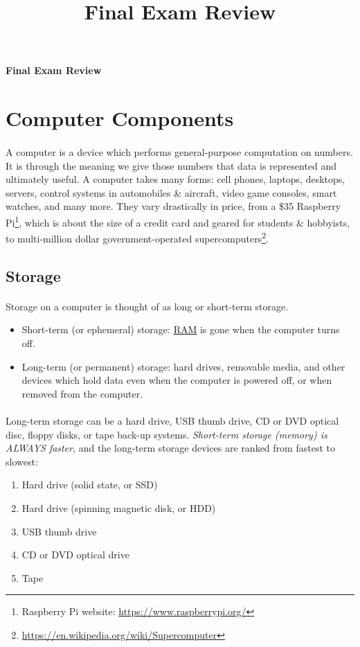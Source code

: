 \documentclass[letter,11pt]{article}
\title{Final Exam Review}
\begin{document}
\huge
\textbf{Final Exam Review}
\normalsize

\tableofcontents

\section{Computer Components}
\paragraph{}A computer is a device which performs general-purpose computation on numbers. It is through the meaning we give those numbers that data is represented and ultimately useful. A computer takes many forms: cell phones, laptops, desktops, servers, control systems in automobiles \& aircraft, video game consoles, smart watches, and many more. They vary drastically in price, from a \$35 Raspberry Pi\footnote{Raspberry Pi website: \url{https://www.raspberrypi.org/}}, which is about the size of a credit card and geared for students \& hobbyists, to multi-million dollar government-operated supercomputers\footnote{\url{https://en.wikipedia.org/wiki/Supercomputer}}.

\subsection{Storage}
\paragraph{}Storage on a computer is thought of as long or short-term storage.
\begin{itemize}
    \item Short-term (or ephemeral) storage: \hyperref[sec:ram]{RAM} is gone when the computer turns off.
    \item Long-term (or permanent) storage: hard drives, removable media, and other devices which hold data even when the computer is powered off, or when removed from the computer.
\end{itemize}

\paragraph{}Long-term storage can be a hard drive, USB thumb drive, CD or DVD optical disc, floppy disks, or tape back-up systems. \textit{Short-term storage (memory) is ALWAYS faster}, and the long-term storage devices are ranked from fastest to slowest:
\begin{enumerate}
    \item Hard drive (solid state, or SSD)
    \item Hard drive (spinning magnetic disk, or HDD)
    \item USB thumb drive
    \item CD or DVD optical drive
    \item Tape
\end{enumerate}
\end{document}
